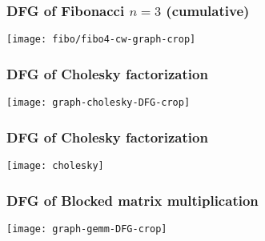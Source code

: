 \begin{frame}
  \frametitle{DFG of Fibonacci $n = 3$ (cumulative)}
  \vspace{-10mm}
  \begin{center}
    \texttt{[image: fibo/fibo4-cw-graph-crop]}
  \end{center}
\end{frame}
\begin{frame}
  \frametitle{DFG of Cholesky factorization}
  \vspace{-10mm}
  \begin{center}
    \texttt{[image: graph-cholesky-DFG-crop]}
  \end{center}
\end{frame}
\begin{frame}
  \frametitle{DFG of Cholesky factorization}
  \vspace{-2mm}
  \begin{center}
    \texttt{[image: cholesky]}
  \end{center}
\end{frame}
\begin{frame}
  \frametitle{DFG of Blocked matrix multiplication}
  \vspace{-10mm}
  \begin{center}
    \texttt{[image: graph-gemm-DFG-crop]}
  \end{center}
\end{frame}

